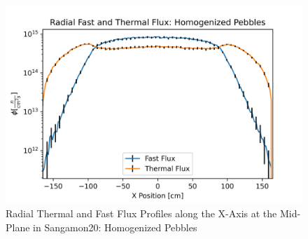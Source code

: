 \begin{figure}[H]
\centering

  \includegraphics[width=0.95\linewidth]{figures/fast_therm_flux_homog.png}

\caption{Radial Thermal and Fast Flux Profiles along the X-Axis at the Mid-Plane in Sangamon20: Homogenized Pebbles}
\label{fig:hom-det-xy}
\end{figure}